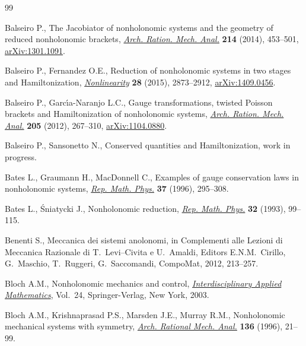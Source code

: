 \begin{thebibliography}{99}
\footnotesize\itemsep=0pt

Balseiro P., The {J}acobiator of nonholonomic systems and the geometry of
  reduced nonholonomic brackets, \href{http://dx.doi.org/10.1007/s00205-014-0759-4}{\textit{Arch. Ration. Mech. Anal.}}
  \textbf{214} (2014), 453--501, \href{http://arxiv.org/abs/1301.1091}{arXiv:1301.1091}.

Balseiro P., Fernandez O.E., Reduction of nonholonomic systems in two stages
  and {H}amiltonization, \href{http://dx.doi.org/10.1088/0951-7715/28/8/2873}{\textit{Nonlinearity}} \textbf{28} (2015), 2873--2912,
  \href{http://arxiv.org/abs/1409.0456}{arXiv:1409.0456}.

Balseiro P., Garc{\'{\i}}a-Naranjo L.C., Gauge transformations, twisted
  {P}oisson brackets and {H}amiltonization of nonholonomic systems,
  \href{http://dx.doi.org/10.1007/s00205-012-0512-9}{\textit{Arch. Ration. Mech. Anal.}} \textbf{205} (2012), 267--310,
  \href{http://arxiv.org/abs/1104.0880}{arXiv:1104.0880}.

Balseiro P., Sansonetto N., Conserved quantities and {H}amiltonization, {w}ork in progress.

Bates L., Graumann H., MacDonnell C., Examples of gauge conservation laws in
  nonholonomic systems, \href{http://dx.doi.org/10.1016/0034-4877(96)84069-9}{\textit{Rep. Math. Phys.}} \textbf{37} (1996), 295--308.

Bates L., {\'S}niatycki J., Nonholonomic reduction, \href{http://dx.doi.org/10.1016/0034-4877(93)90073-N}{\textit{Rep. Math. Phys.}}
  \textbf{32} (1993), 99--115.

Benenti S., Meccanica dei sistemi anolonomi, in Complementi alle Lezioni di
  Meccanica Razionale di T.~Levi--Civita e U.~Amaldi, Editors E.N.M.~Cirillo,
  G.~Maschio, T.~Ruggeri, G.~Saccomandi, CompoMat, 2012, 213--257.

Bloch A.M., Nonholonomic mechanics and control, \href{http://dx.doi.org/10.1007/b97376}{\textit{Interdisciplinary
  Applied Mathematics}}, Vol.~24, Springer-Verlag, New York, 2003.

Bloch A.M., Krishnaprasad P.S., Marsden J.E., Murray R.M., Nonholonomic
  mechanical systems with symmetry, \href{http://dx.doi.org/10.1007/BF02199365}{\textit{Arch. Rational Mech. Anal.}}
  \textbf{136} (1996), 21--99.


\end{thebibliography}
